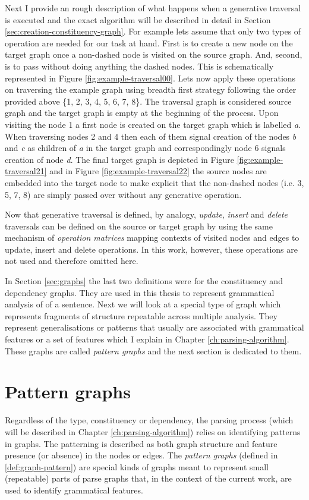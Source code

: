 Next I provide an rough description of what happens when a generative traversal is executed and the exact algorithm will be described in detail in Section \ref{sec:creation-constituency-graph}. For example lets assume that only two types of operation are needed for our task at hand. First is to create a new node on the target graph once a non-dashed node is visited on the source graph. And, second, is to pass without doing anything the dashed nodes. This is schematically represented in Figure \ref{fig:example-traversal00}. Lets now apply these operations on traversing the example graph using breadth first strategy following the order provided above \{1, 2, 3, 4, 5, 6, 7, 8\}. The traversal graph is considered source graph and the target graph is empty at the beginning of the process. Upon visiting the node 1 a first node is created on the target graph which is labelled \textit{a}. When traversing nodes 2 and 4 then each of them signal creation of the nodes \textit{b} and \textit{c} as children of \textit{a} in the target graph and correspondingly node 6 signals creation of node \textit{d}. The final target graph is depicted in Figure \ref{fig:example-traversal21} and in Figure \ref{fig:example-traversal22} the source nodes are embedded into the target node to make explicit that the non-dashed nodes (i.e. 3, 5, 7, 8) are simply passed over without any generative operation. 

Now that generative traversal is defined, by analogy, \textit{update}, \textit{insert} and \textit{delete} traversals can be defined on the source or target graph by using the same mechanism of \textit{operation matrices} mapping contexts of visited nodes and edges to update, insert and delete operations. In this work, however, these operations are not used and therefore omitted here.

In Section \ref{sec:graphs} the last two definitions were for the constituency and dependency graphs. They are used in this thesis to represent grammatical analysis of of a sentence. Next we will look at a special type of graph which represents fragments of structure repeatable across multiple analysis. They represent generalisations or patterns that usually are associated with grammatical features or a set of features which I explain in Chapter \ref{ch:parsing-algorithm}. These graphs are called \textit{pattern graphs} and the next section is dedicated to them.  

\section{Pattern graphs}
\label{sec:pattern-graphs}
Regardless of the type, constituency or dependency, the parsing process (which will be described in Chapter \ref{ch:parsing-algorithm}) relies on identifying patterns in graphs. The patterning is described as both graph structure and feature presence (or absence) in the nodes or edges. The \textit{pattern graphs} (defined in \ref{def:graph-pattern}) are special kinds of graphs meant to represent small (repeatable) parts of parse graphs that, in the context of the current work, are used to identify grammatical features. 

